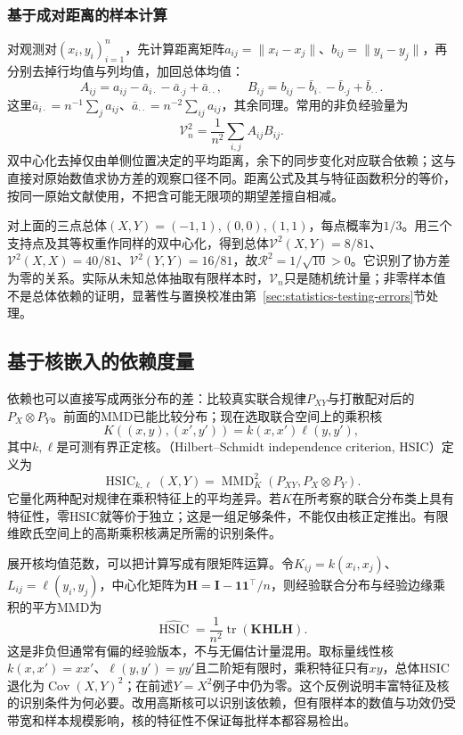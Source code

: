 \subsubsection{基于成对距离的样本计算}
对观测对\((x_i,y_i)_{i=1}^n\)，先计算距离矩阵\(a_{ij}=\|x_i-x_j\|\)、\(b_{ij}=\|y_i-y_j\|\)，再分别去掉行均值与列均值，加回总体均值：
\[
 A_{ij}=a_{ij}-\bar a_{i\cdot}-\bar a_{\cdot j}+\bar a_{\cdot\cdot},
 \qquad
 B_{ij}=b_{ij}-\bar b_{i\cdot}-\bar b_{\cdot j}+\bar b_{\cdot\cdot}.
\]
这里\(\bar a_{i\cdot}=n^{-1}\sum_j a_{ij}\)、\(\bar a_{\cdot\cdot}=n^{-2}\sum_{ij}a_{ij}\)，其余同理。常用的非负经验量为
\[
 \mathcal V_n^2=\frac1{n^2}\sum_{i,j}A_{ij}B_{ij}.
\]
双中心化去掉仅由单侧位置决定的平均距离，余下的同步变化对应联合依赖；这与直接对原始数值求协方差的观察口径不同。距离公式及其与特征函数积分的等价，按同一原始文献使用，不把含可能无限项的期望差擅自相减。

对上面的三点总体\((X,Y)=(-1,1),(0,0),(1,1)\)，每点概率为\(1/3\)。用三个支持点及其等权重作同样的双中心化，得到总体\(\mathcal V^2(X,Y)=8/81\)、\(\mathcal V^2(X,X)=40/81\)、\(\mathcal V^2(Y,Y)=16/81\)，故\(\mathcal R^2=1/\sqrt{10}>0\)。它识别了协方差为零的关系。实际从未知总体抽取有限样本时，\(\mathcal V_n\)只是随机统计量；非零样本值不是总体依赖的证明，显著性与置换校准由第~\ref{sec:statistics-testing-errors}节处理。

\subsection{基于核嵌入的依赖度量}
\label{sec:information-kernel-dependence}

依赖也可以直接写成两张分布的差：比较真实联合规律\(P_{XY}\)与打散配对后的\(P_X\otimes P_Y\)。前面的MMD已能比较分布；现在选取联合空间上的乘积核
\[
 K((x,y),(x',y'))=k(x,x')\ell(y,y'),
\]
其中\(k,\ell\)是可测有界正定核。（Hilbert--Schmidt independence criterion, HSIC）定义为
\begin{equation}
 \operatorname{HSIC}_{k,\ell}(X,Y)
 =\operatorname{MMD}_{K}^{2}(P_{XY},P_X\otimes P_Y).
 \label{eq:information-hsic}
\end{equation}
它量化两种配对规律在乘积特征上的平均差异。若\(K\)在所考察的联合分布类上具有特征性，零HSIC就等价于独立；这是一组足够条件，不能仅由核正定推出。有限维欧氏空间上的高斯乘积核满足所需的识别条件。

展开核均值范数，可以把计算写成有限矩阵运算。令\(K_{ij}=k(x_i,x_j)\)、\(L_{ij}=\ell(y_i,y_j)\)，中心化矩阵为\(\bm H=\bm I-\bm1\bm1^\top/n\)，则经验联合分布与经验边缘乘积的平方MMD为
\[
 \widehat{\operatorname{HSIC}}=\frac1{n^2}
 \operatorname{tr}(\bm K\bm H\bm L\bm H).
\]
这是非负但通常有偏的经验版本，不与无偏估计量混用。取标量线性核\(k(x,x')=xx'\)、\(\ell(y,y')=yy'\)且二阶矩有限时，乘积特征只有\(xy\)，总体HSIC退化为\(\operatorname{Cov}(X,Y)^2\)；在前述\(Y=X^2\)例子中仍为零。这个反例说明丰富特征及核的识别条件为何必要。改用高斯核可以识别该依赖，但有限样本的数值与功效仍受带宽和样本规模影响，核的特征性不保证每批样本都容易检出。

